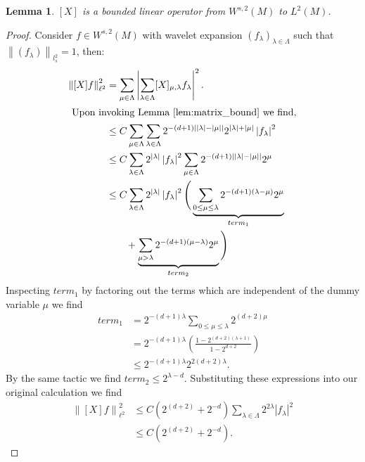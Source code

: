 \documentclass[12pt]{amsart}
\newcommand{\abs}[1]{\left| #1 \right|}
\newcommand{\norm}[1]{\left\| #1 \right\|}
\newcommand{\card}[1]{\left| #1 \right|}
\newtheorem{lem}{Lemma}
\begin{document}
\begin{lem} \label{lem:M_bound}
	$[X]$ is a bounded linear operator from $W^{s,2}(M)$ to $L^2(M)$.
\end{lem}
\begin{proof}
	Consider $f \in W^{s,2}(M)$ with wavelet expansion $(f_\lambda)_{\lambda \in \Lambda}$ such that $\norm{(f_\lambda)}_{l_s^2} = 1$, then:
	\begin{align*}
		\norm{[X] f}_{\ell^2}^2   &=    \sum_{\mu \in \Lambda} \abs{ \sum_{\lambda \in \Lambda} [X]_{\mu,\lambda} f_{\lambda} }^2. \\
		\intertext{ Upon invoking Lemma \ref{lem:matrix_bound} we find,}
							&\leq C\sum_{\mu \in \Lambda} \sum_{\lambda \in \Lambda} 2^{-(d+1)\abs{\card{\lambda} - \card{\mu}}} 2^{\card{\lambda}+\card{\mu}} \abs{f_\lambda}^2 \\
							&\leq C\sum_{\lambda \in \Lambda} 2^{\card{\lambda}} \abs{f_\lambda}^2 \sum_{\mu \in \Lambda} 2^{-(d+1)\abs{\card{\lambda}-\card{\mu}}}2^\mu \\
							&\leq C\sum_{\lambda \in \Lambda}  2^{\card{\lambda}} \abs{f_\lambda}^2 \Bigg( \underbrace{\sum_{0\leq\mu\leq\lambda} 2^{-(d+1)(\lambda - \mu)}2^{\mu}}_{term_1} \\
							&\qquad  + \underbrace{\sum_{\mu > \lambda} 2^{-(d+1)(\mu-\lambda)}2^{\mu} }_{term_2} \Bigg) \label{eq:terms}
		\end{align*}
		Inspecting $term_1$ by factoring out the terms which are independent of the dummy variable $\mu$ we find
		\begin{align*}
			term_1 &= 2^{-(d+1) \lambda }\sum_{0\leq\mu\leq\lambda} 2^{(d+2) \mu} \\
			&= 2^{-(d+1) \lambda} \left(  \frac{ 1-2^{(d+2)(\lambda + 1)} }{1 - 2^{d+2} } \right) \\
			&\leq 2^{-(d+1) \lambda} 2^{2(d+2)\lambda}.
		\end{align*}
		By the same tactic we find $term_2 \leq 2^{\lambda - d}$.  Substituting these expressions into our original calculation we find
		\begin{align*}	
			\norm{[X]f}_{\ell^2}^2 	&\leq C(2^{(d+2)}+2^{-d}) \sum_{\lambda \in \Lambda} 2^{2\lambda} \abs{f_{\lambda}}^2 \\
							&\leq C(2^{(d+2)}+2^{-d}).
		\end{align*}
\end{proof}
\end{document}
